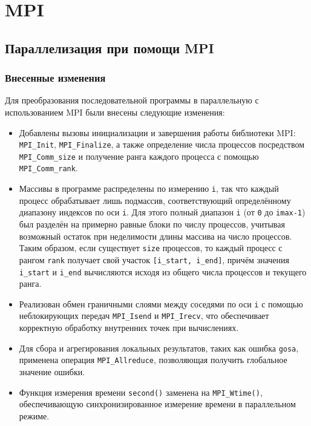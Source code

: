 \documentclass[a4paper, 11pt]{article}
\begin{document}
\section*{MPI}

\subsection*{Параллелизация при помощи MPI}

\subsubsection*{Внесенные изменения}
Для преобразования последовательной программы в параллельную с использованием MPI были внесены следующие изменения:

\begin{itemize}
    \item Добавлены вызовы инициализации и завершения работы библиотеки MPI: \texttt{MPI\_Init}, \texttt{MPI\_Finalize}, а также определение числа процессов посредством \texttt{MPI\_Comm\_size} и получение ранга каждого процесса с помощью \texttt{MPI\_Comm\_rank}.
    
    \item Массивы в программе распределены по измерению \texttt{i}, так что каждый процесс обрабатывает лишь подмассив, соответствующий определённому диапазону индексов по оси \texttt{i}. Для этого полный диапазон \texttt{i} (от \texttt{0} до \texttt{imax-1}) был разделён на примерно равные блоки по числу процессов, учитывая возможный остаток при неделимости длины массива на число процессов. Таким образом, если существует \texttt{size} процессов, то каждый процесс с рангом \texttt{rank} получает свой участок \texttt{[i\_start, i\_end]}, причём значения \texttt{i\_start} и \texttt{i\_end} вычисляются исходя из общего числа процессов и текущего ранга.
    
    \item Реализован обмен граничными слоями между соседями по оси \texttt{i} с помощью неблокирующих передач \texttt{MPI\_Isend} и \texttt{MPI\_Irecv}, что обеспечивает корректную обработку внутренних точек при вычислениях.
    
    \item Для сбора и агрегирования локальных результатов, таких как ошибка \texttt{gosa}, применена операция \texttt{MPI\_Allreduce}, позволяющая получить глобальное значение ошибки.
    
    \item Функция измерения времени \texttt{second()} заменена на \texttt{MPI\_Wtime()}, обеспечивающую синхронизированное измерение времени в параллельном режиме.
\end{itemize}
\newpage
\end{document}
